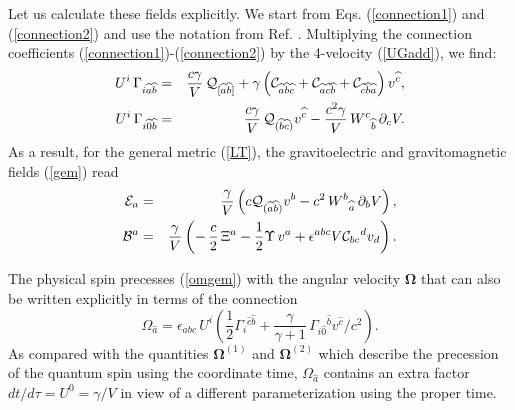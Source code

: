 \documentclass[preprint,showpacs,preprintnumbers,eqsecnum,amsmath,amssymb]{revtex4}
\begin{document}
Let us calculate these fields explicitly. We start from Eqs. (\ref{connection1})
and (\ref{connection2}) and use the notation from Ref. \cite{OST}. 
Multiplying the connection coefficients (\ref{connection1})-(\ref{connection2})
by the 4-velocity (\ref{UGadd}), we find:
\begin{eqnarray}\label{UG1}
U^i\,\Gamma_{i{\widehat a}{\widehat b}} &=& {\frac {c\gamma}{V}}
\,{\cal Q}_{[{\widehat{a}}{\widehat{b}}]} + \gamma\left({\cal C}_{\widehat{a} 
\widehat{b}\widehat{c}} + {\cal C}_{\widehat{a}\widehat{c}\widehat{b}} +
{\cal C}_{\widehat{c}\widehat{b}\widehat{a}}\right)v^{\widehat{c}},\\
U^i\,\Gamma_{i{\widehat 0}{\widehat b}} &=& {\frac {c\gamma}V}
\,{\cal Q}_{(\widehat{b}\widehat{c})}v^{\widehat{c}} - {\frac {c^2\gamma}V}
\,W^c{}_{\widehat{b}}\,\partial_cV.\label{UG2}
\end{eqnarray}
As a result, for the general metric (\ref{LT}), the
gravitoelectric and gravitomagnetic fields (\ref{gem}) read
\begin{eqnarray}\label{ge}
{\mathcal E}_a &=& {\frac {\gamma}V}\left(c{\cal
Q}_{(\widehat{a}\widehat{b})}v^b -
c^2\,W^b{}_{\widehat{a}}\,\partial_bV\right),\\ \label{gm}
{\mathcal B}^a &=& {\frac {\gamma}V}\left(-\,{\frac c2}\,{\Xi}^a -
{\frac 12}\Upsilon\,v^a + \epsilon^{abc}V{\cal C}_{bc}{}^dv_d\right).
\end{eqnarray}

The physical spin precesses (\ref{omgem}) with the angular
velocity ${\bm\Omega}$ that can also be written explicitly in
terms of the connection \cite{PK,OST}
\begin{equation}
\Omega_{\widehat{a}} = \epsilon_{abc}\,U^i\left({\frac 12}\Gamma_i{}^{\widehat{c}
\widehat{b}} +{\frac {\gamma}{\gamma + 1}}\,\Gamma_{i\widehat{0}}{}^{\widehat{b}}
v^{\widehat{c}}/c^2\right).\label{OmegaG}
\end{equation}
As compared with the quantities $\bm\Omega^{(1)}$ and
$\bm\Omega^{(2)}$ which describe the precession of the quantum
spin using the coordinate time, $\Omega_{\widehat{a}}$ contains an
extra factor $dt/d\tau = U^0 =\gamma/ V$ in view of a different
parameterization using the proper time.
\end{document}
